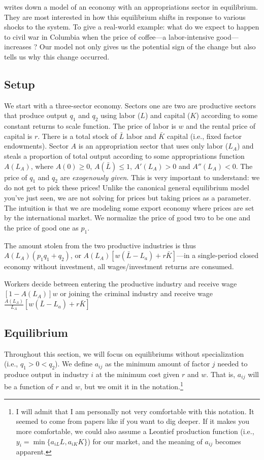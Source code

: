 \citet{dalbodalbo} writes down a model of an economy with an appropriations sector in equilibrium. They are most interested in how this equilibrium shifts in response to various shocks to the system. To give a real-world example: what do we expect to happen to civil war in Columbia when the price of coffee---a labor-intensive good---increases \citep{dube2013commodity}? Our model not only gives us the potential sign of the change but also tells us why this change occurred.
\subsection*{Setup}
We start with a three-sector economy. Sectors one are two are productive sectors that produce output $q_1$ and $q_2$ using labor ($L$) and capital ($K$) according to some constant returns to scale function. The price of labor is $w$ and the rental price of capital is $r$. There is a total stock of $\bar{L}$ labor and $\bar{K}$ capital (i.e., fixed factor endowments). Sector $A$ is an appropriation sector that uses only labor ($L_A$) and steals a proportion of total output according to some appropriations function $A(L_A)$, where $A(0) \geq 0$, $A(\bar{L}) \leq 1$, $A'(L_A) > 0$ and $A''(L_A) < 0$. The price of $q_1$ and $q_2$ are \emph{exogenously given}. This is very important to understand: we do not get to pick these prices! Unlike the canonical general equilibrium model you've just seen, we are not solving for prices but taking prices as a parameter. The intuition is that we are modeling some export economy where prices are set by the international market. We normalize the price of good two to be one and the price of good one as $p_1$.

The amount stolen from the two productive industries is thus $A(L_A)(p_1q_1 + q_2)$, or $A(L_A)[w(\bar{L} - L_a) + r\bar{K}]$---in a single-period closed economy without investment, all wages/investment returns are consumed.

Workers decide between entering the productive industry and receive wage $[1 - A(L_A)]w$ or joining the criminal industry and receive wage $\frac{A(L_A)}{L_A}[w(\bar{L} - L_a) + r\bar{K}]$
\subsection*{Equilibrium}
Throughout this section, we will focus on equilibriums without specialization (i.e., $q_1 > 0 < q_2$). We define $a_{ij}$ as the minimum amount of factor $j$ needed to produce output in industry $i$ at the minimum cost given $r$ and $w$. That is, $a_{ij}$ will be a function of $r$ and $w$, but we omit it in the notation.\footnote{I will admit that I am personally not very comfortable with this notation. It seemed to come from papers like \citet{Jones1965GE} if you want to dig deeper. If it makes you more comfortable, we could also assume a Leontief production function (i.e., $y_i = \min\{a_{iL}L, a_{iK}K\}$) for our market, and the meaning of $a_{ij}$ becomes apparent. } 

